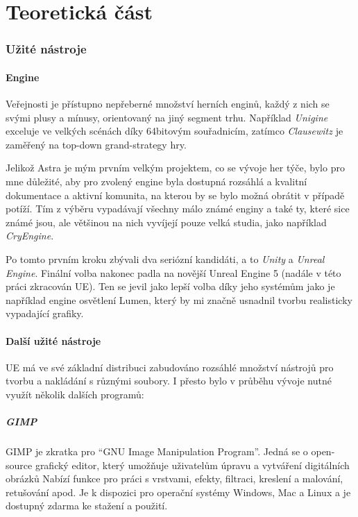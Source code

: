 \documentclass[12pt,a4paper,hidelinks]{article}
\begin{document}
\part{Teoretická část}
\section{Užité nástroje}
\subsection{Engine}
Veřejnosti je přístupno nepřeberné množství herních enginů, každý z nich se svými plusy a mínusy, orientovaný na jiný segment trhu. Například \textit{Unigine} exceluje ve velkých scénách díky 64bitovým souřadnicím, zatímco \textit{Clausewitz} je zaměřený na top-down grand-strategy hry.

Jelikož Astra je mým prvním velkým projektem, co se vývoje her týče, bylo pro mne důležité, aby pro zvolený engine byla dostupná rozsáhlá a kvalitní dokumentace a aktivní komunita, na kterou by se bylo možná obrátit v případě potíží. Tím z výběru vypadávají všechny málo známé enginy a také ty, které sice známé jsou, ale většinou na nich vyvíjejí pouze velká studia, jako například \textit{CryEngine}.

Po tomto prvním kroku zbývali dva seriózní kandidáti, a to \textit{Unity} a \textit{Unreal Engine}. Finální volba nakonec padla na novější Unreal Engine 5 (nadále v této práci zkracován UE). Ten se jevil jako lepší volba díky jeho systémům jako je například engine osvětlení Lumen, který by mi značně usnadnil tvorbu realisticky vypadající grafiky.

\subsection{Další užité nástroje}
UE má ve své základní distribuci zabudováno rozsáhlé množství nástrojů pro tvorbu a nakládání s různými soubory. I přesto bylo v průběhu vývoje nutné využít několik dalších programů:

\subsubsection{GIMP}
GIMP je zkratka pro \enquote{GNU Image Manipulation Program}. Jedná se o open-source grafický editor, který umožňuje uživatelům úpravu a vytváření digitálních obrázků Nabízí funkce pro práci s vrstvami, efekty, filtraci, kreslení a malování, retušování apod. Je k dispozici pro operační systémy Windows, Mac a Linux a je dostupný zdarma ke stažení a použití.
\end{document}
